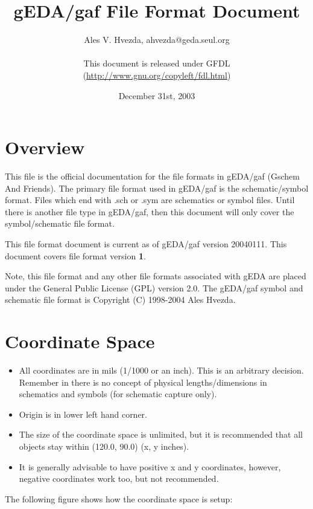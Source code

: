 \documentclass{article}
\title{gEDA/gaf File Format Document}
\author{Ales V. Hvezda, ahvezda@geda.seul.org\\
        \\
        This document is released under GFDL\\
	(\url{http://www.gnu.org/copyleft/fdl.html})}
\date{December 31st, 2003}
\begin{document}
\maketitle
\newpage

\tableofcontents
\newpage


\section{Overview}

This file is the official documentation for the file formats in gEDA/gaf
(Gschem And Friends).  The primary file format used in gEDA/gaf is the
schematic/symbol format.  Files which end with .sch or .sym are schematics
or symbol files.  Until there is another file type in gEDA/gaf, then this
document will only cover the symbol/schematic file format.  

This file format document is current as of gEDA/gaf version 20040111.  This
document covers file format version {\bf 1}.

Note, this file format and any other file formats associated with gEDA are
placed under the General Public License (GPL) version 2.0.  The gEDA/gaf
symbol and schematic file format is Copyright (C) 1998-2004 Ales Hvezda.


\section{Coordinate Space}
\begin{itemize}
 \item All coordinates are in mils (1/1000 or an inch).  This is an arbitrary decision. Remember in there is no concept of physical lengths/dimensions in schematics
and symbols (for schematic capture only).  
 \item Origin is in lower left hand corner.
 \item The size of the coordinate space is unlimited, but it is recommended that all objects stay within (120.0, 90.0) (x, y inches).
 \item It is generally advisable to have positive x and y coordinates, however, negative coordinates work too, but not recommended.
\end{itemize}

The following figure shows how the coordinate space is setup:

\begin{center}
\end{center}
\end{document}
